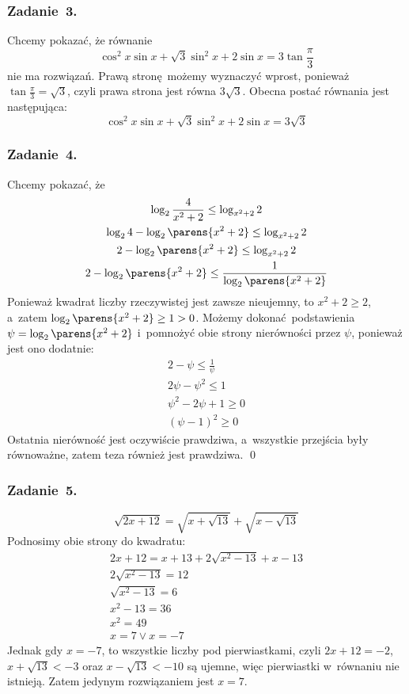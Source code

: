 \subsubsection*{Zadanie~3.}
Chcemy pokazać, że równanie
\begin{equation*}
    \cos^2{x}\sin{x} + \sqrt{3}\sin^2{x} + 2\sin{x} = 3\tan{\frac{\pi}{3}}
\end{equation*}
nie ma rozwiązań. Prawą stronę możemy wyznaczyć wprost, ponieważ \(\tan{\frac{\pi}{3}} = \sqrt{3}\), czyli prawa strona jest równa \(3\sqrt{3}\). Obecna postać równania jest następująca:
\begin{equation*}
    \cos^2{x}\sin{x} + \sqrt{3}\sin^2{x} + 2\sin{x} = 3\sqrt{3}
\end{equation*}
\subsubsection*{Zadanie~4.}
Chcemy pokazać, że
\begin{gather*}
    \log_{2}{\frac{4}{x^2 + 2}} \leq \log_{x^2 + 2}{2}\\
    \log_{2}{4} - \log_{2}\parens{x^2 + 2} \leq \log_{x^2 + 2}2\\
    2 - \log_{2}\parens{x^2 + 2} \leq \log_{x^2 + 2}2\\
    2 - \log_{2}\parens{x^2 + 2} \leq \frac{1}{\log_{2}\parens{x^2 + 2}}
\end{gather*}
Ponieważ kwadrat liczby rzeczywistej jest zawsze nieujemny, to \(x^2 + 2 \geq 2\), a~zatem \(\log_{2}\parens{x^2 + 2} \geq 1 > 0\). Możemy dokonać podstawienia \(\psi = \log_{2}\parens{x^2 + 2}\) i~pomnożyć obie strony nierówności przez \(\psi\), ponieważ jest ono dodatnie:
\begin{gather*}
    2 - \psi \leq \frac{1}{\psi}\\
    2\psi - \psi^2 \leq 1\\
    \psi^2 - 2\psi + 1 \geq 0\\
    (\psi - 1)^2 \geq 0
\end{gather*}
Ostatnia nierówność jest oczywiście prawdziwa, a~wszystkie przejścia były równoważne, zatem teza również jest prawdziwa.
\qed
\subsubsection*{Zadanie~5.}
\begin{equation*}
    \sqrt{2x + 12} = \sqrt{x + \sqrt{13}} + \sqrt{x - \sqrt{13}}
\end{equation*}
Podnosimy obie strony do kwadratu:
\begin{gather*}
    2x + 12 = x + 13 + 2\sqrt{x^2 - 13} + x - 13\\
    2\sqrt{x^2 - 13} = 12\\
    \sqrt{x^2 - 13} = 6\\
    x^2 - 13 = 36\\
    x^2 = 49\\
    x = 7 \lor x = -7
\end{gather*}
Jednak gdy \(x = -7\), to wszystkie liczby pod pierwiastkami, czyli \(2x + 12 = -2\), \(x + \sqrt{13} < -3\) oraz \(x - \sqrt{13} < -10\) są ujemne, więc pierwiastki w~równaniu nie istnieją. Zatem jedynym rozwiązaniem jest \(x = 7\).
